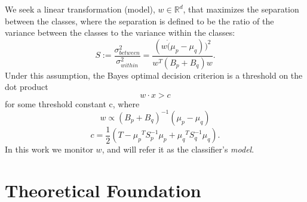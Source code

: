 \documentclass{sig-alternate-05-2015}
\begin{document}
We seek a linear transformation (model), $w \in \mathbb{R}^d $,
that maximizes the separation between the classes, where the separation is
defined to be the ratio of the variance between the classes to the variance
within the classes:
\begin{equation*}
S := \frac{\sigma^2_{between}}{\sigma^2_{within}} = \frac{(w \dot (\mu_p -
\mu_q))^2}{w^T(B_p+B_q)w}.
\end{equation*}
Under this assumption, the Bayes optimal decision criterion is a threshold on the
dot product
\begin{equation*} \label{eq:decision}
w \cdot x > c
\end{equation*}
for some threshold constant c, where
\begin{equation} \label{eq:w}
w \propto (B_p+B_q)^{-1}(\mu_p - \mu_q)
\end{equation}
\begin{equation} \label{eq:c}
c = \frac{1}{2}(T-{\mu_p}^T S_p^{-1} {\mu_p}+{\mu_q}^T S_q^{-1} {\mu_q}).
\end{equation}
In this work we monitor $w$, and will refer it as the
classifier's \textit{model}.
 
\section{Theoretical Foundation}
\end{document}
